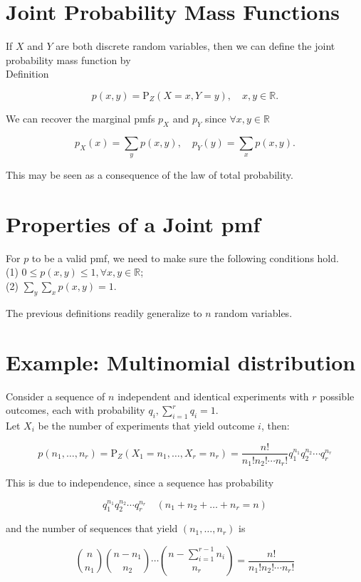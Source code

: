\documentclass[10pt]{article}
\begin{document}
\section*{Joint Probability Mass Functions}
If $X$ and $Y$ are both discrete random variables, then we can define the joint probability mass function by\\
Definition

$$
p(x, y)=\mathrm{P}_{Z}(X=x, Y=y), \quad x, y \in \mathbb{R} .
$$

We can recover the marginal pmfs $p_{X}$ and $p_{Y}$ since $\forall x, y \in \mathbb{R}$

$$
p_{X}(x)=\sum_{y} p(x, y), \quad p_{Y}(y)=\sum_{x} p(x, y) .
$$

This may be seen as a consequence of the law of total probability.

\section*{Properties of a Joint pmf}
For $p$ to be a valid pmf, we need to make sure the following conditions hold.\\
(1) $0 \leq p(x, y) \leq 1, \forall x, y \in \mathbb{R}$;\\
(2) $\sum_{y} \sum_{x} p(x, y)=1$.

The previous definitions readily generalize to $n$ random variables.

\section*{Example: Multinomial distribution}
Consider a sequence of $n$ independent and identical experiments with $r$ possible outcomes, each with probability $q_{i}, \sum_{i=1}^{r} q_{i}=1$.\\
Let $X_{i}$ be the number of experiments that yield outcome $i$, then:

$$
p\left(n_{1}, \ldots, n_{r}\right)=\mathrm{P}_{Z}\left(X_{1}=n_{1}, \ldots, X_{r}=n_{r}\right)=\frac{n!}{n_{1}!n_{2}!\cdots n_{r}!} q_{1}^{n_{1}} q_{2}^{n_{2}} \cdots q_{r}^{n_{r}}
$$

This is due to independence, since a sequence has probability

$$
q_{1}^{n_{1}} q_{2}^{n_{2}} \cdots q_{r}^{n_{r}} \quad\left(n_{1}+n_{2}+\ldots+n_{r}=n\right)
$$

and the number of sequences that yield $\left(n_{1}, \ldots, n_{r}\right)$ is

$$
\binom{n}{n_{1}}\binom{n-n_{1}}{n_{2}} \cdots\binom{n-\sum_{i=1}^{r-1} n_{i}}{n_{r}}=\frac{n!}{n_{1}!n_{2}!\cdots n_{r}!}
$$
\end{document}
